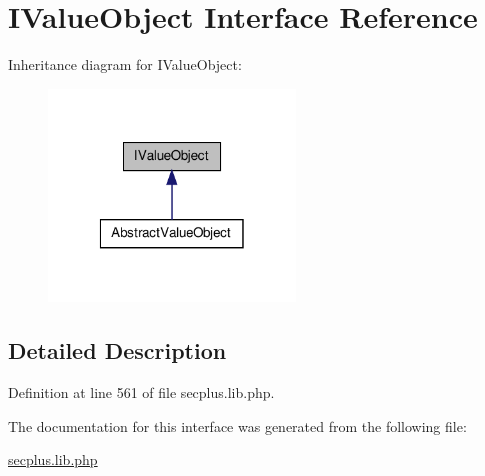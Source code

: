 \hypertarget{interface_sec_plus_1_1_i_value_object}{
\section{IValueObject Interface Reference}
\label{interface_sec_plus_1_1_i_value_object}
}


Inheritance diagram for IValueObject:\nopagebreak
\begin{figure}[H]
\begin{center}
\leavevmode
\includegraphics[width=186pt]{interface_sec_plus_1_1_i_value_object__inherit__graph}
\end{center}
\end{figure}


\subsection{Detailed Description}


Definition at line 561 of file secplus.lib.php.



The documentation for this interface was generated from the following file:\begin{DoxyCompactItemize}
\item 
\hyperlink{secplus_8lib_8php}{secplus.lib.php}\end{DoxyCompactItemize}
